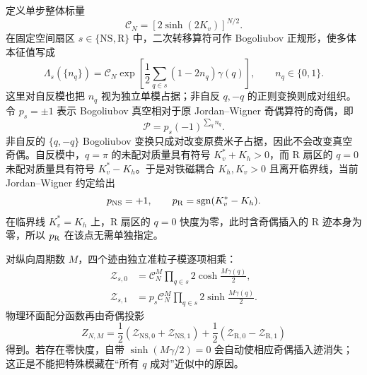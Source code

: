 定义单步整体标量
\[
 \mathcal C_N=[2\sinh(2K_v)]^{N/2}.
\]
在固定空间扇区 \(s\in\{\mathrm{NS},\mathrm R\}\) 中，二次转移算符可作 Bogoliubov 正规形，使多体本征值写成
\begin{equation}
 \Lambda_s(\{n_q\})
 =\mathcal C_N
 \exp\!\left[
 \frac12\sum_{q\in s}(1-2n_q)\gamma(q)
 \right],
 \qquad n_q\in\{0,1\}.
 \label{eq:phys-sm-finite-spectrum-structure}
\end{equation}
这里对自反模也把 \(n_q\) 视为独立单模占据；非自反 \(q,-q\) 的正则变换则成对组织。令 \(p_s=\pm1\) 表示 Bogoliubov 真空相对于原 Jordan--Wigner 奇偶算符的奇偶，即
\[
 \mathcal P
 =p_s(-1)^{\sum_q n_q}.
\]
非自反的 \(\{q,-q\}\) Bogoliubov 变换只成对改变原费米子占据，因此不会改变真空奇偶。自反模中，\(q=\pi\) 的未配对质量具有符号 \(K_v^*+K_h>0\)，而 R 扇区的 \(q=0\) 未配对质量具有符号 \(K_v^*-K_h\)。于是对铁磁耦合 \(K_h,K_v>0\) 且离开临界线，当前 Jordan--Wigner 约定给出
\begin{equation}
 p_{\rm NS}=+1,
 \qquad
 p_{\rm R}=\operatorname{sgn}(K_v^*-K_h).
 \label{eq:phys-sm-bogoliubov-vacuum-parity}
\end{equation}
在临界线 \(K_v^*=K_h\) 上，R 扇区的 \(q=0\) 快度为零，此时含奇偶插入的 R 迹本身为零，所以 \(p_{\rm R}\) 在该点无需单独指定。

对纵向周期数 \(M\)，四个迹由独立准粒子模逐项相乘：
\begin{align}
 \mathcal Z_{s,0}
 &=\mathcal C_N^M
 \prod_{q\in s}
 2\cosh\frac{M\gamma(q)}{2},
 \label{eq:phys-sm-sector-trace-cosh}\\
 \mathcal Z_{s,1}
 &=p_s\mathcal C_N^M
 \prod_{q\in s}
 2\sinh\frac{M\gamma(q)}{2}.
 \label{eq:phys-sm-sector-trace-sinh}
\end{align}
物理环面配分函数再由奇偶投影
\begin{equation}
 Z_{N,M}
 =\frac12(\mathcal Z_{\mathrm{NS},0}+\mathcal Z_{\mathrm{NS},1})
 +\frac12(\mathcal Z_{\mathrm R,0}-\mathcal Z_{\mathrm R,1})
 \label{eq:phys-sm-finite-torus-four-traces}
\end{equation}
得到。若存在零快度，自带 \(\sinh(M\gamma/2)=0\) 会自动使相应奇偶插入迹消失；这正是不能把特殊模藏在“所有 \(q\) 成对”近似中的原因。

